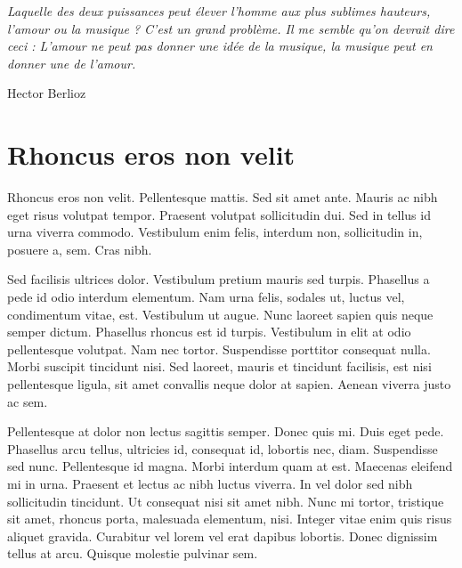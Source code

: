 \documentclass[../hdr.tex]{subfiles}
\begin{document}
\label{chap:part1-titre}

\epigraph{\itshape 
  Laquelle des deux puissances peut élever l'homme aux plus sublimes hauteurs,
  l'amour ou la musique ? C'est un grand problème. Il me semble qu'on devrait
  dire ceci : L'amour ne peut pas donner une idée de la musique, la musique peut
  en donner une de l'amour.
}{Hector Berlioz\footnotemark[1]}
\addtocounter{footnote}{1}

\section{Rhoncus eros non velit}

Rhoncus eros non velit. Pellentesque mattis. Sed sit amet ante. Mauris ac nibh
eget risus volutpat tempor. Praesent volutpat sollicitudin dui. Sed in tellus id
urna viverra commodo. Vestibulum enim felis, interdum non, sollicitudin in,
posuere a, sem. Cras nibh.

Sed facilisis ultrices dolor. Vestibulum pretium mauris sed turpis. Phasellus a
pede id odio interdum elementum. Nam urna felis, sodales ut, luctus vel,
condimentum vitae, est. Vestibulum ut augue. Nunc laoreet sapien quis neque
semper dictum. Phasellus rhoncus est id turpis. Vestibulum in elit at odio
pellentesque volutpat. Nam nec tortor. Suspendisse porttitor consequat nulla.
Morbi suscipit tincidunt nisi. Sed laoreet, mauris et tincidunt facilisis, est
nisi pellentesque ligula, sit amet convallis neque dolor at sapien. Aenean
viverra justo ac sem.

Pellentesque at dolor non lectus sagittis semper. Donec quis mi. Duis eget pede.
Phasellus arcu tellus, ultricies id, consequat id, lobortis nec, diam.
Suspendisse sed nunc. Pellentesque id magna. Morbi interdum quam at est.
Maecenas eleifend mi in urna. Praesent et lectus ac nibh luctus viverra. In vel
dolor sed nibh sollicitudin tincidunt. Ut consequat nisi sit amet nibh. Nunc mi
tortor, tristique sit amet, rhoncus porta, malesuada elementum, nisi. Integer
vitae enim quis risus aliquet gravida. Curabitur vel lorem vel erat dapibus
lobortis. Donec dignissim tellus at arcu. Quisque molestie pulvinar sem.
\end{document}
